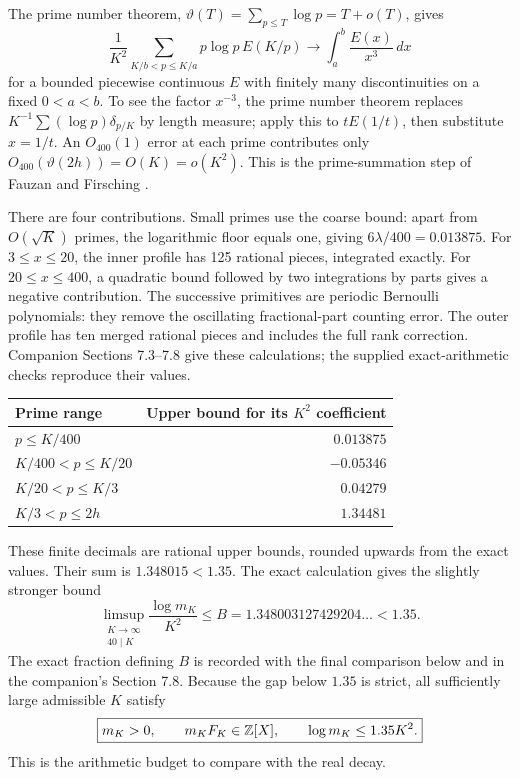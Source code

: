 The prime number theorem,
\(\vartheta(T)=\sum_{p\le T}\log p=T+o(T)\), gives
\begin{equation}\label{growth:prime-sum}
 \frac1{K^2}\sum_{K/b<p\le K/a}p\log p\,E(K/p)
 \longrightarrow\int_a^b\frac{E(x)}{x^3}\,dx
\end{equation}
for a bounded piecewise continuous \(E\) with finitely many
discontinuities on a fixed \(0<a<b\).
To see the factor \(x^{-3}\), the prime number theorem replaces
\(K^{-1}\sum(\log p)\delta_{p/K}\) by length measure; apply this to
\(tE(1/t)\), then substitute \(x=1/t\).
An \(O_{400}(1)\) error at each prime contributes only
\(O_{400}(\vartheta(2h))=O(K)=o(K^2)\).
This is the prime-summation step of Fauzan and Firsching
\cite[Section 5]{fauzan}\cite[\texttt{PrimeSumIntegral.lean}]{firsching}.

There are four contributions. Small primes use the coarse bound:
apart from \(O(\sqrt K)\) primes, the logarithmic floor equals one,
giving \(6\lambda/400=0.013875\).
For \(3\le x\le20\), the inner profile has 125 rational pieces,
integrated exactly. For \(20\le x\le400\), a quadratic bound followed
by two integrations by parts gives a negative contribution.
The successive primitives are periodic Bernoulli polynomials: they
remove the oscillating fractional-part counting error.
The outer profile has ten merged rational pieces and includes the
full rank correction. Companion Sections 7.3--7.8 give these calculations;
the supplied exact-arithmetic checks reproduce their values.

\begin{center}
\begin{tabular}{l r}
\toprule
Prime range & Upper bound for its \(K^2\) coefficient\\
\midrule
\(p\le K/400\) & \(0.013875\)\\
\(K/400<p\le K/20\) & \(-0.05346\)\\
\(K/20<p\le K/3\) & \(0.04279\)\\
\(K/3<p\le2h\) & \(1.34481\)\\
\bottomrule
\end{tabular}
\end{center}
These finite decimals are rational upper bounds, rounded upwards
from the exact values. Their sum is \(1.348015<1.35\).
The exact calculation gives the slightly stronger bound
\[
 \limsup_{\substack{K\to\infty\\40\mid K}}
 \frac{\log m_K}{K^2}
 \le B=1.348003127429204\ldots<1.35.
\]
The exact fraction defining \(B\) is recorded with the final comparison
below and in the companion's Section 7.8.
Because the gap below \(1.35\) is strict, all sufficiently large
admissible \(K\) satisfy
\begin{equation}\label{growth:final}
 \boxed{m_K>0,\qquad m_KF_K\in\mathbb Z[X],\qquad
        \log m_K\le1.35K^2.}
\end{equation}
This is the arithmetic budget to compare with the real decay.
